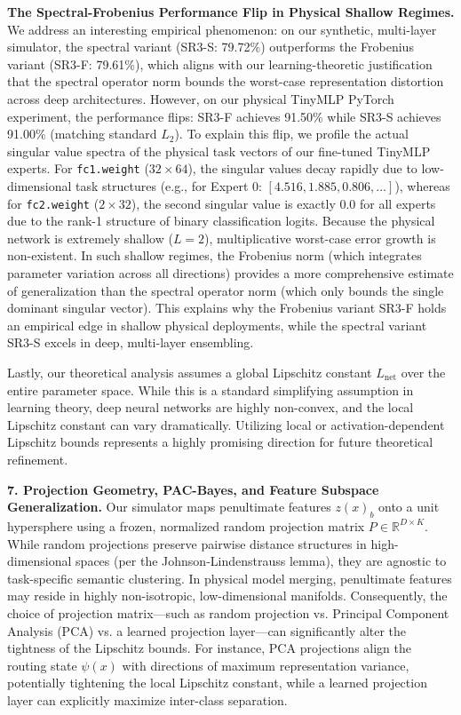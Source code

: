 \textbf{The Spectral-Frobenius Performance Flip in Physical Shallow Regimes.}
We address an interesting empirical phenomenon: on our synthetic, multi-layer simulator, the spectral variant (SR3-S: 79.72\%) outperforms the Frobenius variant (SR3-F: 79.61\%), which aligns with our learning-theoretic justification that the spectral operator norm bounds the worst-case representation distortion across deep architectures. However, on our physical TinyMLP PyTorch experiment, the performance flips: SR3-F achieves 91.50\% while SR3-S achieves 91.00\% (matching standard $L_2$). To explain this flip, we profile the actual singular value spectra of the physical task vectors of our fine-tuned TinyMLP experts. 
For \texttt{fc1.weight} ($32\times 64$), the singular values decay rapidly due to low-dimensional task structures (e.g., for Expert 0: $[4.516, 1.885, 0.806, \dots]$), whereas for \texttt{fc2.weight} ($2\times 32$), the second singular value is exactly $0.0$ for all experts due to the rank-1 structure of binary classification logits. Because the physical network is extremely shallow ($L=2$), multiplicative worst-case error growth is non-existent. In such shallow regimes, the Frobenius norm (which integrates parameter variation across all directions) provides a more comprehensive estimate of generalization than the spectral operator norm (which only bounds the single dominant singular vector). This explains why the Frobenius variant SR3-F holds an empirical edge in shallow physical deployments, while the spectral variant SR3-S excels in deep, multi-layer ensembling.

Lastly, our theoretical analysis assumes a global Lipschitz constant $L_{\text{net}}$ over the entire parameter space. While this is a standard simplifying assumption in learning theory, deep neural networks are highly non-convex, and the local Lipschitz constant can vary dramatically. Utilizing local or activation-dependent Lipschitz bounds represents a highly promising direction for future theoretical refinement.

\textbf{7. Projection Geometry, PAC-Bayes, and Feature Subspace Generalization.}
Our simulator maps penultimate features $z(x)_b$ onto a unit hypersphere using a frozen, normalized random projection matrix $P \in \mathbb{R}^{D \times K}$. While random projections preserve pairwise distance structures in high-dimensional spaces (per the Johnson-Lindenstrauss lemma), they are agnostic to task-specific semantic clustering. In physical model merging, penultimate features may reside in highly non-isotropic, low-dimensional manifolds. Consequently, the choice of projection matrix—such as random projection vs. Principal Component Analysis (PCA) vs. a learned projection layer—can significantly alter the tightness of the Lipschitz bounds. For instance, PCA projections align the routing state $\psi(x)$ with directions of maximum representation variance, potentially tightening the local Lipschitz constant, while a learned projection layer can explicitly maximize inter-class separation.

